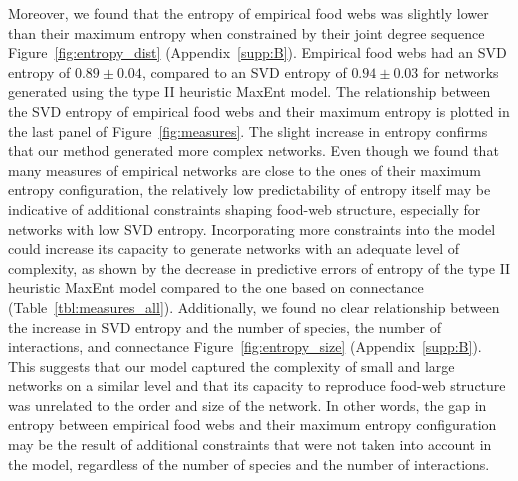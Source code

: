 Moreover, we found that the entropy of empirical food webs was slightly lower
than their maximum entropy when constrained by their joint degree sequence
Figure~\ref{fig:entropy_dist} (Appendix~\ref{supp:B}). Empirical food webs had an
SVD entropy of $0.89 \pm 0.04$, compared to an SVD entropy of $0.94 \pm 0.03$
for networks generated using the type II heuristic MaxEnt model. The
relationship between the SVD entropy of empirical food webs and their maximum
entropy is plotted in the last panel of Figure~\ref{fig:measures}. The slight
increase in entropy confirms that our method generated more complex networks.
Even though we found that many measures of empirical networks are close to the
ones of their maximum entropy configuration, the relatively low predictability
of entropy itself may be indicative of additional constraints shaping food-web
structure, especially for networks with low SVD entropy. Incorporating more
constraints into the model could increase its capacity to generate networks with
an adequate level of complexity, as shown by the decrease in predictive errors
of entropy of the type II heuristic MaxEnt model compared to the one based on
connectance (Table~\ref{tbl:measures_all}). Additionally, we found no clear
relationship between the increase in SVD entropy and the number of species, the
number of interactions, and connectance Figure~\ref{fig:entropy_size}
(Appendix~\ref{supp:B}). This suggests that our model captured the complexity of
small and large networks on a similar level and that its capacity to reproduce
food-web structure was unrelated to the order and size of the network. In other
words, the gap in entropy between empirical food webs and their maximum entropy
configuration may be the result of additional constraints that were not taken
into account in the model, regardless of the number of species and the number of
interactions. 


